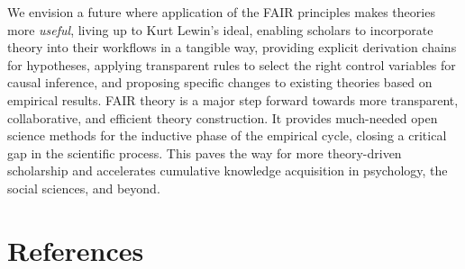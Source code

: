 \documentclass[
  man, noextraspace,floatsintext]{apa7}
\begin{document}
We envision a future where application of the FAIR principles makes theories more \emph{useful},
living up to Kurt Lewin's ideal,
enabling scholars to incorporate theory into their workflows in a tangible way,
providing explicit derivation chains for hypotheses,
applying transparent rules to select the right control variables for causal inference,
and proposing specific changes to existing theories based on empirical results.
FAIR theory is a major step forward towards more transparent, collaborative, and efficient theory construction.
It provides much-needed open science methods for the inductive phase of the empirical cycle,
closing a critical gap in the scientific process.
This paves the way for more theory-driven scholarship
and accelerates cumulative knowledge acquisition in psychology, the social sciences, and beyond.

\newpage

\section{References}\label{references}
\end{document}
